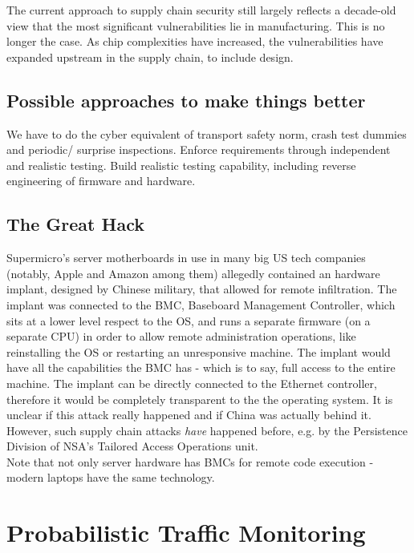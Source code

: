 \documentclass[11pt,oneside,a4paper]{article}
\begin{document}
The current approach to supply chain security still largely reflects a decade-old view that the most significant vulnerabilities lie in manufacturing. This is no longer the case. As chip complexities have increased, the vulnerabilities have expanded upstream in the supply chain, to include design.

\subsection{Possible approaches to make things better}

We have to do the cyber equivalent of transport safety norm, crash test dummies and periodic/ surprise inspections. Enforce requirements through independent and realistic testing. Build realistic testing capability, including reverse engineering of firmware and hardware.

\subsection{The Great Hack}

Supermicro’s server motherboards in use in many big US tech companies (notably, Apple and Amazon
among them) allegedly contained an hardware implant, designed by Chinese military, that allowed for remote infiltration. The implant was connected to the BMC, Baseboard Management Controller, which sits at a lower level respect to the OS, and runs a separate firmware (on a separate CPU) in order to allow remote administration operations, like reinstalling the OS or restarting an unresponsive machine. The implant would have all the capabilities the BMC has - which is to say, full access to the entire machine. The implant can be directly connected to the Ethernet controller, therefore it would be completely transparent to the the operating system. It is unclear if this attack really happened and if China was actually behind it. However, such supply chain attacks \textit{have} happened before, e.g. by the Persistence Division of NSA’s Tailored Access Operations unit.\\
Note that not only server hardware has BMCs for remote code execution - modern laptops have the same technology.

\section{Probabilistic Traffic Monitoring}
\end{document}
